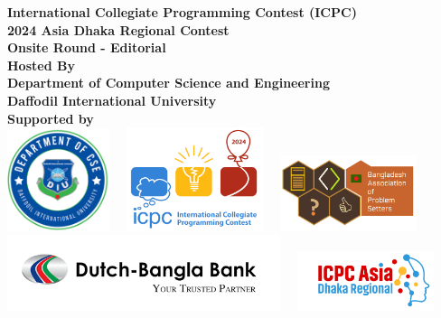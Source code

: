 \documentclass[11pt,a4paper]{article}
\begin{document}
\begin{titlepage}
    \begin{center}
        \textbf{\large International Collegiate Programming Contest (ICPC)\\
        2024 Asia Dhaka Regional Contest\\
        Onsite Round - Editorial\\
        }
        \vspace{3cm}
        \textbf{\large Hosted By \\
        Department of Computer Science and Engineering\\
        Daffodil International University\\}
        \vspace{7cm}
        \textbf{\large Supported by\\}
        \vspace{1cm}
        \includegraphics[width=3cm]{images/diu.png} \ \ 
        \includegraphics[width=4cm]{images/icpc.png} \ \ 
        \includegraphics[width=4cm]{images/baps.png} \\
        \vspace{1cm}
        \includegraphics[width=8cm]{images/dbbl.png} \ \ 
        \includegraphics[width=4cm]{images/regional.png} \ \ 
        
    \end{center}
\end{titlepage}
\end{document}
